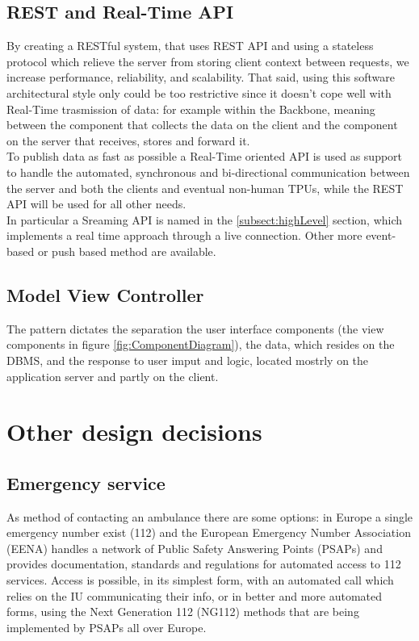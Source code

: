 \subsection{REST and Real-Time API}
\label{subsect:API}
By creating a RESTful system, that uses REST API and using a stateless protocol which relieve the server from storing client context between requests, we increase performance, reliability, and scalability. That said, using this software architectural style only could be too restrictive since it doesn't cope well with Real-Time trasmission of data: for example within the Backbone, meaning between the component that collects the data on the client and the component on the server that receives, stores and forward it. \\
To publish data as fast as possible a Real-Time oriented API is used as support to handle the automated, synchronous and bi-directional communication between the server and both the clients and eventual non-human TPUs, while the REST API will be used for all other needs. \\
In particular a Sreaming API is named in the \ref{subsect:highLevel} section, which implements a real time approach through a live connection. Other more event-based or push based method are available.

\subsection{Model View Controller}
The pattern dictates the separation the user interface components (the view components in figure \ref{fig:ComponentDiagram}), the data, which resides on the DBMS, and the response to user imput and logic, located mostrly on the application server and partly on the client.
\section{Other design decisions}
\subsection{Emergency service}
\label{subsect:ES}
As method of contacting an ambulance there are some options: in Europe a single emergency number exist (112) and the European Emergency Number Association (EENA) handles a network of Public Safety Answering Points (PSAPs) and provides documentation, standards and regulations for automated access to 112 services. Access is possible, in its simplest form, with an automated call which relies on the IU communicating their info, or in better and more automated forms, using the Next Generation 112 (NG112) methods that are being implemented by PSAPs all over Europe.

